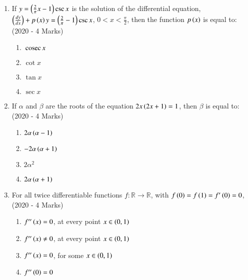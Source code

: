 \documentclass[journal]{IEEEtran}
\begin{document}
\begin{enumerate}
{        }
 	\item{
			If $y = \left(\frac{2}{\pi}x-1\right) \csc x$ is the solution of the differential equation, $\left(\frac{dy}{dx}\right)+p\left(x\right)y = \left(\frac{2}{\pi}-1\right)\csc x$, $0<x<\frac{\pi}{2}$, then the function $p\left(x\right)$ is equal to: 
			\hfill
			{(2020 - 4 Marks)}
			
			\begin{multicols}{4}
				\begin{enumerate}
					\item $\,\text{cosec}\, x$
					\item $\cot x$
					\item $\tan x$
					\item $\sec x$
				\end{enumerate}
			\end{multicols}
			
		}
 	\item{
			If $\alpha$ and $\beta$ are the roots of the equation $2x\left(2x+1\right) = 1$, then $\beta$ is equal to:\\ \text{ }
			\hfill
			{(2020 - 4 Marks)}
			
			\begin{multicols}{2}
				\begin{enumerate}
					\item $2\alpha\left(\alpha-1\right)$
					\item $-2\alpha\left(\alpha+1\right)$
					\item $2\alpha^2$
					\item $2\alpha\left(\alpha+1\right)$
				\end{enumerate}
			\end{multicols}
			
		}
    \item{
            For all twice differentiable functions \( f: \mathbb{R} \to \mathbb{R} \), with \( f\left(0\right) = f\left(1\right) = f^{\prime}\left(0\right) = 0 \), \\ \text{ }
             \hfill
                {(2020 - 4 Marks)}
            \begin{multicols}{2}
                \begin{enumerate}
                    \item $f^{\prime\prime}\left(x\right) = 0$, at every point $x \in \left(0,1\right)$
                    \item $f^{\prime\prime}\left(x\right) \neq 0$, at every point $x \in \left(0,1\right)$
                    \item $f^{\prime\prime}\left(x\right) = 0$, for some $x \in \left(0,1\right)$
                    \item $f^{\prime\prime}\left(0\right) = 0$
                \end{enumerate}
            \end{multicols}

}
\end{enumerate}
\end{document}
